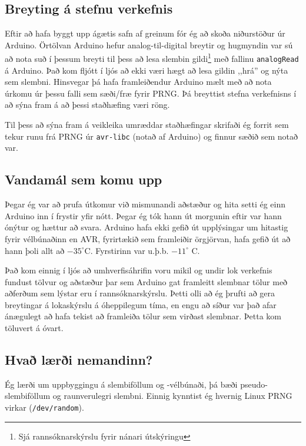 \documentclass[a4paper]{article}           %
\begin{document}
\subsection{Breyting á stefnu verkefnis}

Eftir að hafa byggt upp ágætis safn af greinum fór ég að skoða niðurstöður úr Arduino. Örtölvan Arduino hefur analog-til-digital breytir og hugmyndin var sú að nota suð í þessum breyti til þess að lesa slembin gildi\footnote{Sjá rannsóknarskýrslu fyrir nánari útskýringu} með fallinu \texttt{analogRead} á Arduino. Það kom fljótt í ljós að ekki væri hægt að lesa gildin ,,hrá'' og nýta sem slembni. 
Hinsvegar þá hafa framleiðendur Arduino mælt með að nota úrkomu úr þessu falli sem sæði/fræ fyrir PRNG. Þá breyttist stefna verkefnisns í að sýna fram á að þessi staðhæfing væri röng. 

Til þess að sýna fram á veikleika umræddar staðhæfingar skrifaði ég forrit sem tekur runu frá PRNG úr \texttt{avr-libc} (notað af Arduino) og finnur sæðið sem notað var.

\subsection{Vandamál sem komu upp}

Þegar ég var að prufa útkomur við mismunandi aðstæður og hita setti ég einn Arduino inn í frystir yfir nótt. Þegar ég tók hann út morgunin eftir var hann ónýtur og hættur að svara. Arduino hafa ekki gefið út upplýsingar um hitastig fyrir vélbúnaðinn en AVR, fyrirtækið sem framleiðir örgjörvan, hafa gefið út að hann þoli allt að $-35^\circ$C. Fyrstirinn var u.þ.b. $-11^\circ$ C. 

Það kom einnig í ljós að umhverfisáhrifin voru mikil og undir lok verkefnis fundust tölvur og aðstæður þar sem Arduino gat framleitt slembnar tölur með aðferðum sem lýstar eru í rannsóknarskýrslu. Þetti olli að ég þrufti að gera breytingar á lokaskýrslu á óheppilegum tíma, en engu að síður var það afar ánægulegt að hafa tekist að framleiða tölur sem virðast slembnar. Þetta kom töluvert á óvart. 

\subsection{Hvað lærði nemandinn?}

Ég lærði um uppbyggingu á slembiföllum og -vélbúnaði, þá bæði pseudo-slembiföllum og raunverulegri slembni. Einnig kynntist ég hvernig Linux PRNG virkar (\texttt{/dev/random}). 
\end{document}
